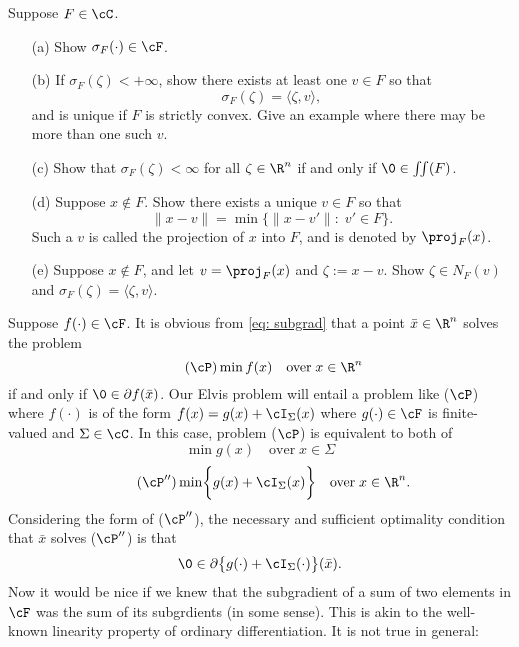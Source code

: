 \documentclass[12pt]{article}
\begin{document}
{\blue
\begin{exer}  Suppose $F\in\cC$.
\begin{itemize}
\item[(a)]  Show $\sigma_F(\cdot)\in\cF$.
\item[(b)]  If $\sigma_{F}(\zeta)<+\infty$, show there exists at least one $v\in F$ so that
\[
\sigma_{F}(\zeta)=\langle \zeta,v\rangle,
\]
and is unique if $F$ is strictly convex.  Give an example where there may be more than one such $v$.
\item[(c)]  Show that $\sigma_{F}(\zeta)<\infty$ for all $\zeta\in\R^n$ if and only if $\0\in\iint(F)$.  
\item[(d)]  Suppose $x\not\in F$.  Show there exists a unique $v\in F$ so that 
\[
\|x-v\|=\min\bigl\{\|x-v'\|:\;v'\in F\bigr\}.
\] 
Such a $v$ is called the projection of $x$ into $F$, and is denoted by $\proj_{F}(x)$.
\item[(e)]  Suppose $x\not\in F$, and let $v=\proj_F(x)$ and $\zeta := x - v$.  Show $\zeta\in N_{F}(v)$ and $\sigma_{F}(\zeta)=\langle \zeta,v\rangle$.
\end{itemize}
\end{exer}
}
Suppose $f(\cdot)\in\cF$.  It is obvious from \eqref{eq: subgrad} that a point $\bar x\in\R^n$ solves the problem
\begin{equation}\label{eq: cvx min1}\tag{$\cP$}
\min f(x)\quad\text{over}\;x\in \R^n
\end{equation} 
if and only if $\0\in\partial f(\bar x)$.  Our Elvis problem will entail a problem like ($\cP$) where $f(\cdot)$ is of the form $f(x)=g(x)+\cI_{\Sigma}(x)$ where $g(\cdot)\in\cF$ is finite-valued and $\Sigma\in\cC$.  In this case, problem ($\cP$) is equivalent to both of 
\begin{equation}\label{eq: cvx min2}\tag{$\cP'$}
\min g(x)\quad\text{over}\;x\in \Sigma
\end{equation} 
\begin{equation}\label{eq: cvx min3}\tag{$\cP''$}
\min \biggl\{g(x)+\cI_{\Sigma}(x)\biggr\}\quad\text{over}\;x\in\R^n.
\end{equation} 
Considering the form of ($\cP''$), the necessary and sufficient optimality condition that $\bar x$ solves ($\cP''$) is that 
\begin{equation}\label{eq: opt1}
\0\in\partial\bigl\{g(\cdot)+\cI_{\Sigma}(\cdot)\bigr\}(\bar x).
\end{equation} 
Now it would be nice if we knew that the subgradient of a sum of two elements in $\cF$ was the sum of its subgrdients (in some sense).  This is akin to the well-known linearity property of ordinary differentiation.  It is not true in general:
\end{document}
